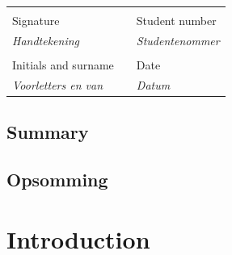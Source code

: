 \documentclass[12pt,a4paper]{report}
\begin{document}
\vspace{1cm}
\begin{table}[ht]
	\begin{center}
		\begin{tabular*}{15.5cm}{@{\extracolsep{\fill}}lll}
			\makebox[8cm]{\hrulefill} & & \makebox[6cm]{\hrulefill}\\
			Signature & & Student number \\
			\textit{Handtekening} & & \textit{Studentenommer} \\[1cm]
		    \makebox[8cm]{\hrulefill} & & \makebox[6cm]{\hrulefill}\\ 
			Initials and surname & & Date \\
			\textit{Voorletters en van} & & \textit{Datum}\\
		\end{tabular*}
	\end{center}
\end{table}
\newpage

\section*{Summary}
\section*{Opsomming}


\newpage

\tableofcontents
\listoffigures
\listoftables
\printacronyms[name={List of Abbreviations}]
\newpage

\chapter{Introduction}
\end{document}
